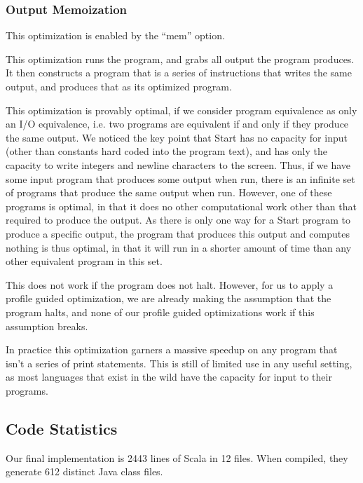 \documentclass[12pt,letterpaper]{article}
\begin{document}
\subsubsection*{Output Memoization}

This optimization is enabled by the ``mem'' option.

This optimization runs the program, and grabs all output the program
produces. It then constructs a program that is a series of
instructions that writes the same output, and produces that as its
optimized program.

This optimization is provably optimal, if we consider program
equivalence as only an I/O equivalence, i.e. two programs are
equivalent if and only if they produce the same output. We noticed the
key point that Start has no capacity for input (other than constants
hard coded into the program text), and has only the capacity to write
integers and newline characters to the screen. Thus, if we have some
input program that produces some output when run, there is an infinite
set of programs that produce the same output when run. However, one of
these programs is optimal, in that it does no other computational work
other than that required to produce the output. As there is only one
way for a Start program to produce a specific output, the program that
produces this output and computes nothing is thus optimal, in that it
will run in a shorter amount of time than any other equivalent program
in this set.

This does not work if the program does not halt. However, for us to
apply a profile guided optimization, we are already making the
assumption that the program halts, and none of our profile guided
optimizations work if this assumption breaks.

In practice this optimization garners a massive speedup on any program
that isn't a series of print statements. This is still of limited use
in any useful setting, as most languages that exist in the wild have
the capacity for input to their programs.

\subsection*{Code Statistics}

Our final implementation is 2443 lines of Scala in 12 files. When
compiled, they generate 612 distinct Java class files. 
\end{document}
